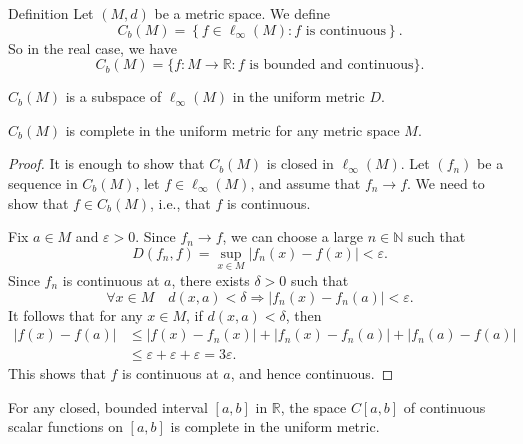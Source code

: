 \documentclass[a4paper,11pt]{article}
\begin{document}
\begin{definition}
    Definition Let $(M, d)$ be a metric space. We define
    \[
    C_b(M)=\left\{f \in \ell_{\infty}(M): f \text { is continuous}\right\}.
    \]
    So in the real case, we have
    \[
    C_b(M)=\{f: M \rightarrow \mathbb{R}: f \text { is bounded and continuous}\}.
    \]
\end{definition}

\begin{note}
    $C_b(M)$ is a subspace of $\ell_{\infty}(M)$ in the uniform metric $D$.
\end{note}

\begin{theorem}
    $C_b(M)$ is complete in the uniform metric for any metric space $M$.
\end{theorem}

\begin{proof}
    It is enough to show that $C_b(M)$ is closed in $\ell_{\infty}(M)$. Let $\left(f_n\right)$ be a sequence in $C_b(M)$, let $f \in \ell_{\infty}(M)$, and assume that $f_n \rightarrow f$. We need to show that $f \in C_b(M)$, i.e., that $f$ is continuous. 
    
    Fix $a \in M$ and $\varepsilon>0$. Since $f_n \rightarrow f$, we can choose a large $n \in \mathbb{N}$ such that
    \[
    D\left(f_n, f\right)=\sup _{x \in M}\left|f_n(x)-f(x)\right|<\varepsilon.
    \]
    Since $f_n$ is continuous at $a$, there exists $\delta>0$ such that
    \[
    \forall x \in M \quad d(x, a)<\delta \Longrightarrow\left|f_n(x)-f_n(a)\right|<\varepsilon.
    \]
    It follows that for any $x \in M$, if $d(x, a)<\delta$, then
    \[
    \begin{aligned}
    |f(x)-f(a)| & \leqslant\left|f(x)-f_n(x)\right|+\left|f_n(x)-f_n(a)\right|+\left|f_n(a)-f(a)\right| \\
    & \leqslant \varepsilon+\varepsilon+\varepsilon=3 \varepsilon.
    \end{aligned}
    \]
    This shows that $f$ is continuous at $a$, and hence continuous.
\end{proof}

\begin{corollary}
    For any closed, bounded interval $[a, b]$ in $\mathbb{R}$, the space $C[a, b]$ of continuous scalar functions on $[a, b]$ is complete in the uniform metric.
\end{corollary}
\end{document}
